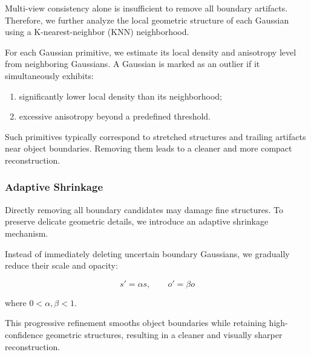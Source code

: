 Multi-view consistency alone is insufficient to remove all boundary artifacts. Therefore, we further analyze the local geometric structure of each Gaussian using a K-nearest-neighbor (KNN) neighborhood.

For each Gaussian primitive, we estimate its local density and anisotropy level from neighboring Gaussians. A Gaussian is marked as an outlier if it simultaneously exhibits:

\begin{enumerate}
    \item significantly lower local density than its neighborhood;
    \item excessive anisotropy beyond a predefined threshold.
\end{enumerate}

Such primitives typically correspond to stretched structures and trailing artifacts near object boundaries. Removing them leads to a cleaner and more compact reconstruction.

\subsubsection{Adaptive Shrinkage}

Directly removing all boundary candidates may damage fine structures. To preserve delicate geometric details, we introduce an adaptive shrinkage mechanism.

Instead of immediately deleting uncertain boundary Gaussians, we gradually reduce their scale and opacity:

$$
s'=\alpha s,\qquad
o'=\beta o
$$

where $0<\alpha,\beta<1$.

This progressive refinement smooths object boundaries while retaining high-confidence geometric structures, resulting in a cleaner and visually sharper reconstruction.
